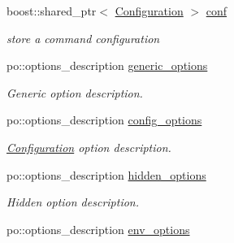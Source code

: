 \begin{DoxyCompactItemize}
\item 
\hypertarget{classOptions_aa2a4911d6f461fa4344597d45df22433}{
boost::shared\_\-ptr$<$ \hyperlink{classConfiguration}{Configuration} $>$ \hyperlink{classOptions_aa2a4911d6f461fa4344597d45df22433}{conf}}
\label{classOptions_aa2a4911d6f461fa4344597d45df22433}

\begin{DoxyCompactList}\small\item\em store a command configuration \item\end{DoxyCompactList}\item 
\hypertarget{classOptions_a79936d4e43f65d6711bc1d02a0f507a0}{
po::options\_\-description \hyperlink{classOptions_a79936d4e43f65d6711bc1d02a0f507a0}{generic\_\-options}}
\label{classOptions_a79936d4e43f65d6711bc1d02a0f507a0}

\begin{DoxyCompactList}\small\item\em Generic option description. \item\end{DoxyCompactList}\item 
\hypertarget{classOptions_a7118d23e146af863fd4a78f99901af7c}{
po::options\_\-description \hyperlink{classOptions_a7118d23e146af863fd4a78f99901af7c}{config\_\-options}}
\label{classOptions_a7118d23e146af863fd4a78f99901af7c}

\begin{DoxyCompactList}\small\item\em \hyperlink{classConfiguration}{Configuration} option description. \item\end{DoxyCompactList}\item 
\hypertarget{classOptions_a88be7149f845f65143c5a109f908c95c}{
po::options\_\-description \hyperlink{classOptions_a88be7149f845f65143c5a109f908c95c}{hidden\_\-options}}
\label{classOptions_a88be7149f845f65143c5a109f908c95c}

\begin{DoxyCompactList}\small\item\em Hidden option description. \item\end{DoxyCompactList}\item 
\hypertarget{classOptions_ae252d94c542047dcc2cc1b753a8dd59c}{
po::options\_\-description \hyperlink{classOptions_ae252d94c542047dcc2cc1b753a8dd59c}{env\_\-options}}
\label{classOptions_ae252d94c542047dcc2cc1b753a8dd59c}


\end{DoxyCompactItemize}
